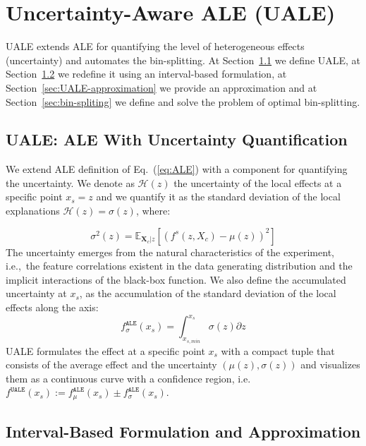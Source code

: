\documentclass[twoside]{article}
\newcommand{\dfdx}{f^s}
\newcommand{\Xcb}{\mathbf{X}_c}
\begin{document}
\section{Uncertainty-Aware ALE (UALE)}
\label{sec:UALE}

UALE extends ALE for quantifying the level of heterogeneous effects
(uncertainty) and automates the bin-splitting. At
Section~\ref{sec:UALE-definition-1} we define UALE, at
Section~\ref{sec:UALE-definition-2} we redefine it using an
interval-based formulation, at
Section~\ref{sec:UALE-approximation} we provide an
approximation and at Section~\ref{sec:bin-spliting} we define and
solve the problem of optimal bin-splitting.

\subsection{UALE: ALE With Uncertainty Quantification}
\label{sec:UALE-definition-1}

We extend ALE definition of Eq.~(\ref{eq:ALE}) with a component for
quantifying the uncertainty. We denote as \(\mathcal{H}(z)\) the
uncertainty of the local effects at a specific point \(x_s=z\) and we
quantify it as the standard deviation of the local explanations
\(\mathcal{H}(z) = \sigma(z)\), where:

\begin{equation}
  \label{eq:ALE_var}
  \sigma^2(z) = \mathbb{E}_{\Xcb|z}\left [ \left (\dfdx (z, X_c) - \mu(z) \right )^2 \right ] 
\end{equation}
\noindent
The uncertainty emerges from the natural characteristics of the
experiment, i.e.,~the feature correlations existent in the data
generating distribution and the implicit interactions of the black-box
function. We also define the accumulated uncertainty at \(x_s\), as
the accumulation of the standard deviation of the local effects along
the axis:
\begin{equation}
  \label{eq:ALE_acc_unc}
  f^{\mathtt{ALE}}_{\sigma}(x_s) = \int_{x_{s, min}}^{x_s} \sigma(z) \partial z
\end{equation}
\noindent
UALE formulates the effect at a specific point \(x_s\) with a compact
tuple that consists of the average effect and the uncertainty
\((\mu(z), \sigma(z))\) and visualizes them as a continuous curve with
a confidence region, i.e.
\(f^{\mathtt{UALE}}(x_s) := f^{\mathtt{ALE}}_{\mu}(x_s) \pm
f^{\mathtt{ALE}}_{\sigma}(x_s)\).

\subsection{Interval-Based Formulation and Approximation}
\label{sec:UALE-definition-2}
\end{document}
